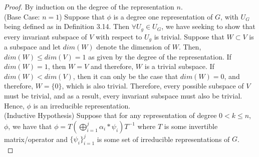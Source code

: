 \documentclass[10pt]{ucthesis}
\begin{document}
\begin{proof} By induction on the degree of the representation $n$. \\

(Base Case: $n = 1$) Suppose that $\phi$ is a degree one representation of $G$, with $U_G$ being defined as in Definition 3.14. Then $\forall U_g \in U_G$, we have seeking to show that every invariant subspace of $V$ with respect to $U_g$ is trivial. Suppose that $W \subset V$ is a subspace and let $dim(W)$ denote the dimension of $W$. Then, $dim(W) \leq dim(V) = 1$ as given by the degree of the representation. If $dim(W) = 1$, then $W=V$ and therefore, $W$ is a trivial subspace. If $dim(W) < dim(V)$, then it can only be the case that $dim(W) = 0$, and therefore, $W= \{0\}$, which is also trivial. Therefore, every possible subspace of $V$ must be trivial, and as a result, every invariant subspace must also be trivial. Hence, $\phi$ is an irreducible representation. \\

(Inductive Hypothesis) Suppose that for any representation of degree $0<k\leq n$, $\phi$, we have that $\phi =T\left(\bigoplus_{i=1}^j \alpha_i*\psi_i\right)T^{-1}$ where $T$ is some invertible matrix/operator and $\{\psi_i\}_{i=1}^j$ is some set of irreducible representations of $G$. \\


\end{proof}
\end{document}
